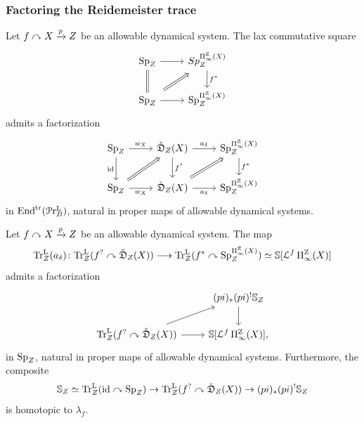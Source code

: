 \subsubsection{Factoring the Reidemeister trace}\label{subsec:factoring-reidemeister}
\begin{thm}
  Let $f\curvearrowright X\xrightarrow pZ$ be an allowable dynamical system. The lax commutative square
  \[
    \begin{tikzcd}
      \Sp_\base\arrow[d,equal] \arrow[r] & Sp_\base^{\ani{\tset}[\base]}\arrow[d,"f^*"]\\
      \Sp_\base\arrow[r]\arrow[ru,Rightarrow, shorten <=5pt,shorten >=5pt] & \Sp_\base^{\ani{\tset}[\base]}
    \end{tikzcd}
  \]
  admits a factorization
  \begin{equation}
    \label{eq:categorical-factorization-of-param-reidemeister}
    \begin{tikzcd}
      \Sp_\base & {\coShat_\base(\tset)} & \Sp_\base^{\ani{\tset}[\base]} \\
      \Sp_\base & {\coShat_\base(\tset)} & \Sp_\base^{\ani{\tset}[\base]}
      \arrow["{w_{\tset}}", from=1-1, to=1-2]
      \arrow["\id"', from=1-1, to=2-1]
      \arrow["{a_{\delta}}", from=1-2, to=1-3]
      \arrow["{f^?}", from=1-2, to=2-2]
      \arrow["f^{\ast}", from=1-3, to=2-3]
      \arrow[Rightarrow, from=2-2, to=1-3]
      \arrow["{w_{\tset}}"', from=2-1, to=2-2]
      \arrow[Rightarrow, from=2-1, to=1-2]
      \arrow["{a_{\delta}}"', from=2-2, to=2-3]
    \end{tikzcd}
  \end{equation}
  in $\mathrm{End}^{\mathrm{tr}} (\mathcal{P}\mathrm{r}^{\mathrm{L}}_{B})$, natural in proper maps of allowable dynamical systems.
\end{thm}
\begin{prop}\label{prop: lax calculation of trace on coshv hat}
  Let $f\curvearrowright X\xrightarrow pZ$ be an allowable dynamical system. 
  The map
  \[
    \TrcL (a_\delta)\colon \TrcL (f^?\curvearrowright\coShat_\base (\tset ))\too \TrcL(f^*\curvearrowright \Sp_\base^{\ani{\tset}[\base]})\simeq \SS [\cL^{f}\ani{\tset}[\base]]
  \]
  admits a factorization
  \begin{equation}
    \label{eq:lax-trace-on-cosheaves}
    \begin{tikzcd}
      &  (pi)_*(pi)^!\SS_\base\\
      \TrcL (f^?\curvearrowright\coShat_\base (\tset )) & {\SS [\cL^{f}\ani{\tset}[\base]]},
      \arrow[from=1-2, to=2-2]
      \arrow[from=2-1, to=1-2]
      \arrow[from=2-1, to=2-2]
    \end{tikzcd}
  \end{equation}
  in $\operatorname{Sp}_Z$, natural in proper maps of allowable dynamical systems. Furthermore, the composite
  \[
    \mathbb{S}_Z\simeq\mathrm{Tr}^{\mathrm{L}}_{Z} (\operatorname{id}\curvearrowright\operatorname{Sp}_Z)\to \mathrm{Tr}^{\mathrm{L}}_{Z} (f^?\curvearrowright\check{\mathfrak{D}}_Z (X ))\to (pi)_*(pi)^!\mathbb{S}_Z
  \]
  is homotopic to $\lambda_f$.
\end{prop}
